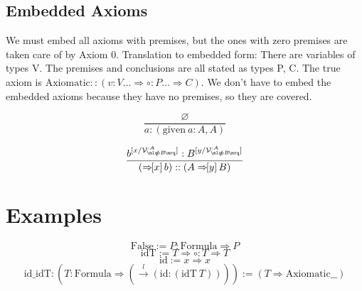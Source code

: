 \documentclass{article}
\newcommand{\usage}{\mathcal{V}}
\newcommand{\usageKnown}[2]{{\usage_{\mlq\hspace{-0.06em}#2\hspace{-0.06em}\mrq}^{:#1}}}
\newcommand{\presep}{\hspace{1.8em}}
\newcommand{\subst}[3]{#1^{[{#2}{/}{#3}]}}
\newcommand{\bindvariable}{\bigstar}
\newcommand{\hole}{\circ}
\newcommand{\hastype}[2]{#1 : #2}
\newcommand{\hastypemeta}[2]{#1 :: #2}
\newcommand{\namemappinguntyped}[2]{#1 \Rightarrow #2}
\newcommand{\namemappingtype}[3]{#1:#2 \Rightarrow #3}
\newcommand{\treemappinguntyped}[2]{\Rightarrow\hspace{-0.4em}[#1]\,#2}
\newcommand{\treemappingtype}[3]{#1 \treemappinguntyped{#2}{#3}}
\newcommand{\unfoldsin}[1]{\overset{#1}{\rightarrow}}
\newcommand{\assuming}[3]{\mathrm{given}\ #1:#2, #3}
\begin{document}



%
%
%
%

  \subsection{Embedded Axioms}
  
  We must embed all axioms with premises, but the ones with zero premises are taken care of by Axiom 0. Translation to embedded form: There are variables of types V. The premises and conclusions are all stated as types P, C. The true axiom is $\hastypemeta{\mathrm{Axiomatic}}{(\namemappingtype{v}{V\dots}{\namemappingtype{\hole}{P\dots}{C}})}$. We don't have to embed the embedded axioms because they have no premises, so they are covered.


  \[ \frac{
\varnothing
  }{
    \hastype{a}{(\assuming{a}{A}{A})}
  } \]

  \[ \frac{
    \hastype{\subst{b}{x}{\usageKnown{A}{bB}}}{\subst{B}{y}{\usageKnown{A}{bB}}}
  }{
    \hastypemeta{
      (\treemappinguntyped{x} b)
    }{
      (\treemappingtype{A}{y}{B})
    }
  } \]



  \section{Examples}\label{structure}
  \[
    \mathrm{False} := \namemappingtype{P}{\mathrm{Formula}}{P}
  \]
  \[
    \mathrm{idT} := \namemappinguntyped{T}{\namemappingtype{\hole}{T}{T}}
  \]
  \[
    \mathrm{id} := \namemappinguntyped{x}{x}
  \]
  \[
    \mathrm{id\_idT} : (\namemappingtype{T}{\mathrm{Formula}}{(\unfoldsin{l}{(\hastype{\mathrm{id}}{(\mathrm{idT}\ T)})})}) := (\namemappinguntyped{T}{\mathrm{Axiomatic \_ \_}})
  \]

\end{document}
